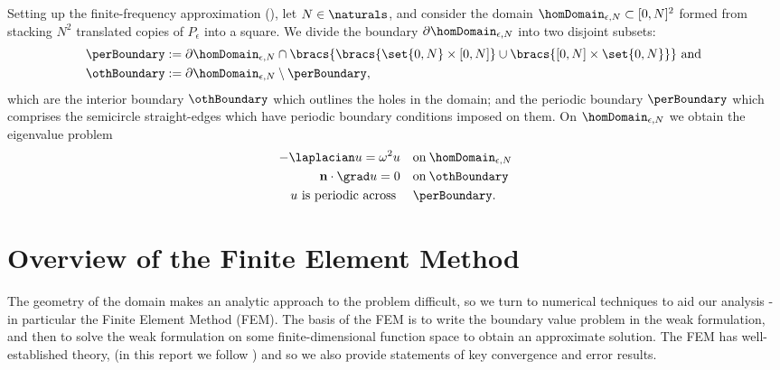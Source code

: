 Setting up the finite-frequency approximation (), let $N\in\naturals$, and consider the domain $\homDomain_{\epsilon, N}\subset[0,N]^{2}$ formed from stacking $N^{2}$ translated copies of $P_{\epsilon}$ into a square. 
We divide the boundary $\partial\homDomain_{\epsilon, N}$ into two disjoint subsets:
\begin{align*}
	\perBoundary &:= \partial\homDomain_{\epsilon, N}\cap\bracs{\bracs{\set{0,N}\times[0,N]}\cup\bracs{[0,N]\times\set{0,N}}} \text{ and } \\
	\othBoundary &:= \partial\homDomain_{\epsilon, N}\setminus\perBoundary,
\end{align*} 
which are the interior boundary $\othBoundary$ which outlines the holes in the domain; and the periodic boundary $\perBoundary$ which comprises the semicircle straight-edges which have periodic boundary conditions imposed on them.
On $\homDomain_{\epsilon, N}$ we obtain the eigenvalue problem
\begin{subequations} \label{eq:HomProbFull}
	\begin{align} 
		-\laplacian u = \omega^{2}u &\quad \mathrm{on \:} \homDomain_{\epsilon, N} \label{eq:HomProbMain}\\
		\mathbf{n}\cdot\grad u = 0 &\quad \mathrm{on \:} \othBoundary \label{eq:HomProbNeumann}\\
		u \text{ is periodic across } &\quad \perBoundary.
	\end{align}
\end{subequations}

\section{Overview of the Finite Element Method} \label{sec:FEMSetup}
The geometry of the domain makes an analytic approach to the problem difficult, so we turn to numerical techniques to aid our analysis - in particular the Finite Element Method (FEM). 
The basis of the FEM is to write the boundary value problem  in the weak formulation, and then to solve the weak formulation on some finite-dimensional function space to obtain an approximate solution. 
The FEM has well-established theory, (in this report we follow \cite{johnson2012numerical}) and so we also provide statements of key convergence and error results. \newline

